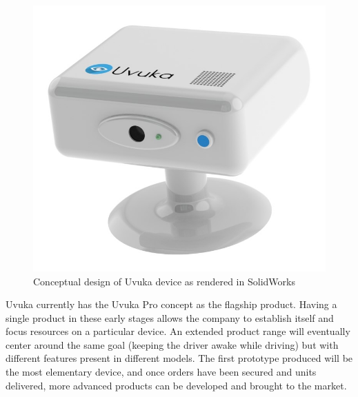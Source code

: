 \begin{figure}[H]
\centering
\includegraphics[width=1\textwidth]{images/Uvuka_casing_concept.JPG}
\vskip10pt
\caption{Conceptual design of Uvuka device as rendered in SolidWorks}
\label{fig:Uvuka_casing_concept}
\end{figure}
\pagebreak
Uvuka currently has the Uvuka Pro concept as the flagship product. Having a single product in these early stages allows the company to establish itself and focus resources on a particular device. An extended product range will eventually center around the same goal (keeping the driver awake while driving) but with different features present in different models. The first prototype produced will be the most elementary device, and once orders have been secured and units delivered, more advanced products can be developed and brought to the market.

